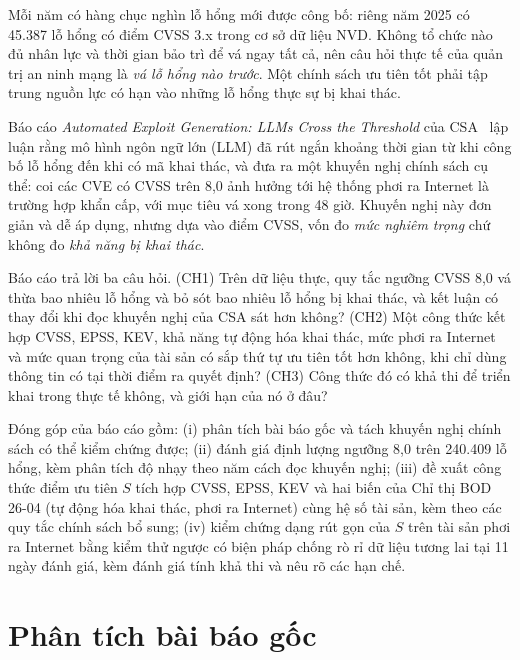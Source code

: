 \documentclass[conference]{IEEEtran}
\begin{document}
Mỗi năm có hàng chục nghìn lỗ hổng mới được công bố: riêng năm 2025 có 45.387 lỗ hổng có điểm
CVSS 3.x trong cơ sở dữ liệu NVD. Không tổ chức nào đủ nhân lực và thời gian bảo trì để vá ngay
tất cả, nên câu hỏi thực tế của quản trị an ninh mạng là \emph{vá lỗ hổng nào trước}. Một chính
sách ưu tiên tốt phải tập trung nguồn lực có hạn vào những lỗ hổng thực sự bị khai thác.

Báo cáo \emph{Automated Exploit Generation: LLMs Cross the Threshold} của CSA~\cite{csa2026}
lập luận rằng mô hình ngôn ngữ lớn (LLM) đã rút ngắn khoảng thời gian từ khi công bố lỗ hổng đến
khi có mã khai thác, và đưa ra một khuyến nghị chính sách cụ thể: coi các CVE có CVSS trên 8,0
ảnh hưởng tới hệ thống phơi ra Internet là trường hợp khẩn cấp, với mục tiêu vá xong trong 48 giờ.
Khuyến nghị này đơn giản và dễ áp dụng, nhưng dựa vào điểm CVSS, vốn đo \emph{mức nghiêm trọng}
chứ không đo \emph{khả năng bị khai thác}.

Báo cáo trả lời ba câu hỏi. (CH1) Trên dữ liệu thực, quy tắc ngưỡng CVSS 8,0 vá thừa bao nhiêu lỗ hổng và bỏ sót bao nhiêu lỗ hổng bị khai thác, và kết luận có thay đổi khi đọc khuyến nghị của CSA sát hơn
không? (CH2) Một công thức kết hợp CVSS, EPSS, KEV, khả năng tự động hóa khai thác, mức phơi ra Internet và mức quan trọng của tài sản có sắp thứ tự ưu
tiên tốt hơn không, khi chỉ dùng thông tin có tại thời điểm ra quyết định? (CH3) Công thức đó có
khả thi để triển khai trong thực tế không, và giới hạn của nó ở đâu?

Đóng góp của báo cáo gồm: (i) phân tích bài báo gốc và tách khuyến nghị chính sách có thể kiểm
chứng được; (ii) đánh giá định lượng ngưỡng 8,0 trên 240.409 lỗ hổng, kèm phân tích độ nhạy theo
năm cách đọc khuyến nghị; (iii) đề xuất công thức điểm ưu tiên $S$ tích hợp CVSS, EPSS, KEV và hai biến của Chỉ thị BOD 26-04 (tự động hóa khai thác, phơi ra Internet) cùng hệ số tài sản, kèm theo các quy tắc chính sách bổ sung; (iv) kiểm chứng dạng rút gọn của $S$ trên tài sản phơi ra Internet bằng kiểm thử ngược có biện pháp chống rò rỉ dữ liệu tương lai tại 11
ngày đánh giá, kèm đánh giá tính khả thi và nêu rõ các hạn chế.

\section{Phân tích bài báo gốc}\label{sec:baibao}
\end{document}
